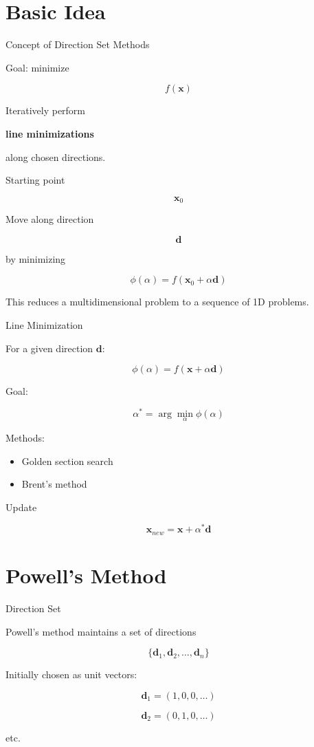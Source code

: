 \documentclass{beamer}
\begin{document}
\section{Basic Idea}

\begin{frame}{Concept of Direction Set Methods}

Goal: minimize

\[
f(\mathbf{x})
\]

Iteratively perform

\textbf{line minimizations}

along chosen directions.

Starting point

\[
\mathbf{x}_0
\]

Move along direction

\[
\mathbf{d}
\]

by minimizing

\[
\phi(\alpha) = f(\mathbf{x}_0 + \alpha \mathbf{d})
\]

This reduces a multidimensional problem to a sequence of 1D problems.
\end{frame}

\begin{frame}{Line Minimization}

For a given direction $\mathbf{d}$:

\[
\phi(\alpha) = f(\mathbf{x} + \alpha \mathbf{d})
\]

Goal:

\[
\alpha^* = \arg\min_\alpha \phi(\alpha)
\]

Methods:

\begin{itemize}
\item Golden section search
\item Brent's method
\end{itemize}

Update

\[
\mathbf{x}_{new} = \mathbf{x} + \alpha^* \mathbf{d}
\]
\end{frame}

\section{Powell's Method}

\begin{frame}{Direction Set}

Powell's method maintains a set of directions

\[
\{\mathbf{d}_1,\mathbf{d}_2,\dots,\mathbf{d}_n\}
\]

Initially chosen as unit vectors:

\[
\mathbf{d}_1 = (1,0,0,\dots)
\]

\[
\mathbf{d}_2 = (0,1,0,\dots)
\]

etc.
\end{frame}
\end{document}
